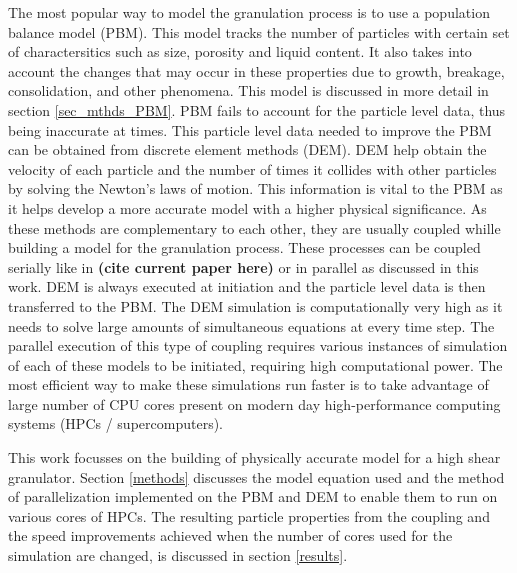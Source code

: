 \documentclass[fleqn,twoside,10pt]{article}
\begin{document}
The most popular way to model the granulation process is to use a population balance model (PBM). This model 
tracks the number of particles with certain set of charactersitics such as size, porosity and liquid content. 
It also takes into account the changes that may occur in these properties due to growth, breakage, consolidation, 
and other phenomena. This model is discussed in more detail in section \ref{sec_mthds_PBM}. PBM fails to account 
for the particle level data, thus being inaccurate at times. This particle level data needed to improve the PBM 
can be obtained from discrete element methods (DEM). DEM help obtain the velocity of each particle and the 
number of times it collides with other particles by solving the Newton's laws of motion. This information 
is vital to the PBM as it helps develop a more accurate model with a higher physical significance. As these 
methods are complementary to each other, they are usually coupled whille building a model for the granulation 
process. These processes can be coupled serially like in \textbf{(cite current paper here)} or in parallel as 
discussed in this work. DEM is always executed at initiation and the particle level data is then transferred to 
the PBM. The DEM simulation is computationally very high as it needs to solve large amounts of simultaneous 
equations at every time step. The parallel execution of this type of coupling requires various instances 
of simulation of each of these models to be initiated, requiring high computational power. The most efficient way 
to make these simulations run faster is to take advantage of large number of CPU cores present on modern day 
high-performance computing systems (HPCs / supercomputers).

This work focusses on the building of physically accurate model for a high shear granulator. Section \ref{methods} 
discusses the model equation used and the method of parallelization implemented on the PBM and DEM to enable them to 
run on various cores of HPCs. The resulting particle properties from the coupling and the speed improvements 
achieved when the number of cores used for the simulation are changed, is discussed in section \ref{results}.

\end{document}
